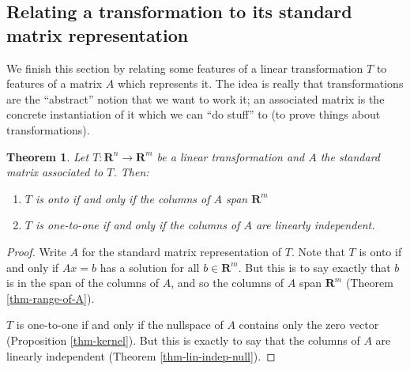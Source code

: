\documentclass[12pt]{article}
\numberwithin{equation}{subsection}
\numberwithin{figure}{subsection}
\newtheorem{thm}[subsection]{Theorem}
\theoremstyle{note}
\begin{document}
\subsection{Relating a transformation to its standard matrix representation}
We finish this section by relating some features of a linear transformation $T$ to features of a matrix $A$ which represents it. The idea is really that transformations are the ``abstract'' notion that we want to work it; an associated matrix is the concrete instantiation of it which we can ``do stuff'' to (to prove things about transformations). 
\begin{thm} \label{thm-in-sur}
	Let $T\colon \mathbf{R}^n\to\mathbf{R}^m$ be a linear transformation and $A$ the standard matrix associated to $T$. Then:
	\begin{enumerate}
		\item $T$ is onto if and only if the columns of $A$ span $\mathbf{R}^m$
		\item $T$ is one-to-one if and only if the columns of $A$ are linearly independent. 
	\end{enumerate}
\end{thm}

\begin{proof}
	Write $A$ for the standard matrix representation of $T$. Note that $T$ is onto if and only if $Ax=b$ has a solution for all $b\in\mathbf{R}^m$. But this is to say exactly that $b$ is in the span of the columns of $A$, and so the columns of $A$ span $\mathbf{R}^m$ (Theorem \ref{thm-range-of-A}). 
	
	$T$ is one-to-one if and only if the nullspace of $A$ contains only the zero vector (Proposition \ref{thm-kernel}). But this is exactly to say that the columns of $A$ are linearly independent (Theorem \ref{thm-lin-indep-null}). \end{proof}
\end{document}
